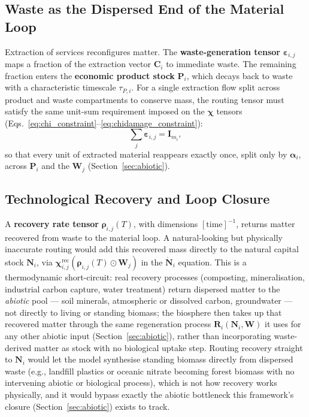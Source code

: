\documentclass[twocolumn,10pt]{article}
\begin{document}
\subsection{Waste as the Dispersed End of the Material Loop}
\label{sec:waste-loop}
Extraction of services reconfigures matter. The \textbf{waste-generation tensor} \(\boldsymbol{\varepsilon}_{i,j}\) maps a fraction of the extraction vector \(\mathbf{C}_i\) to immediate waste. The remaining fraction enters the \textbf{economic product stock} \(\mathbf{P}_i\), which decays back to waste with a characteristic timescale \(\tau_{P,i}\).
For a single extraction flow split across product and waste compartments to conserve mass, the routing tensor must satisfy the same unit-sum requirement imposed on the $\boldsymbol\chi$ tensors (Eqs.~\eqref{eq:chi_constraint}--\eqref{eq:chidamage_constraint}):
\begin{equation}
\sum_j \boldsymbol\varepsilon_{i,j} = \mathbf I_{m_i}, \label{eq:epsilon_constraint}
\end{equation}
so that every unit of extracted material reappears exactly once, split only by $\boldsymbol\alpha_i$, across $\mathbf P_i$ and the $\mathbf W_j$ (Section~\ref{sec:abiotic}).

\subsection{Technological Recovery and Loop Closure}
\label{sec:tech-recovery}
A \textbf{recovery rate tensor} \(\boldsymbol{\rho}_{i,j}(T)\), with dimensions \([\text{time}]^{-1}\), returns matter recovered from waste to the material loop. A natural-looking but physically inaccurate routing would add this recovered mass directly to the natural capital stock $\mathbf N_i$, via $\boldsymbol\chi^{\text{rec}}_{i,j}(\boldsymbol\rho_{i,j}(T)\odot\mathbf W_j)$ in the $\dot{\mathbf N}_i$ equation. This is a thermodynamic short-circuit: real recovery processes (composting, mineralisation, industrial carbon capture, water treatment) return dispersed matter to the \emph{abiotic} pool — soil minerals, atmospheric or dissolved carbon, groundwater — not directly to living or standing biomass; the biosphere then takes up that recovered matter through the same regeneration process $\mathbf R_i(\mathbf N_i,\mathbf W)$ it uses for any other abiotic input (Section~\ref{sec:abiotic}), rather than incorporating waste-derived matter as stock with no biological uptake step. Routing recovery straight to $\mathbf N_i$ would let the model synthesise standing biomass directly from dispersed waste (e.g., landfill plastics or oceanic nitrate becoming forest biomass with no intervening abiotic or biological process), which is not how recovery works physically, and it would bypass exactly the abiotic bottleneck this framework's closure (Section~\ref{sec:abiotic}) exists to track.
\end{document}
